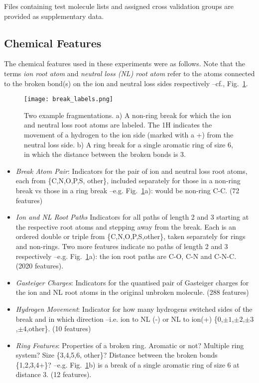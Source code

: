 Files containing test molecule lists and assigned cross validation groups are provided as supplementary data. 

\subsection{Chemical Features}
\label{sec:ChemicalFeatures}

The chemical features used in these experiments were as follows. 
Note that the terms \emph{ion root atom} and \emph{neutral loss (NL) root atom} refer to the atoms connected to the broken bond(s) on the ion and neutral loss sides respectively --cf., Fig.~\ref{fig:breakLabel}.
\begin{figure}[!tpb]
\begin{center}
\texttt{[image: break\_labels.png]}
\caption{Two example fragmentations. a) A non-ring break for which the ion and neutral loss root atoms are labeled. The 1H indicates the movement of a hydrogen to the ion side  (marked with a +) from the neutral loss side. b) A ring break for a single aromatic ring of size 6, in which the distance between the broken bonds is 3.  }
\label{fig:breakLabel}
\end{center}
\vspace{-2em}
\end{figure}
\begin{itemize}
\item \emph{Break Atom Pair}: Indicators for the pair of ion and neutral loss root atoms, each from \{C,N,O,P,S, other\}, included separately for those in a non-ring break vs those in a ring break --e.g. Fig.~\ref{fig:breakLabel}a): would be non-ring C-C. (72 features)
\item \emph{Ion and NL Root Paths} Indicators for all paths of length 2 and 3 starting at the respective root atoms and stepping away from the break. Each is an ordered double or triple from \{C,N,O,P,S,other\}, taken separately for rings and non-rings. Two more features indicate no paths of length 2 and 3 respectively --e.g. Fig.~\ref{fig:breakLabel}a): the ion root paths are C-O, C-N and C-N-C. (2020 features).
\item \emph{Gasteiger Charges}: Indicators for the quantised pair of Gasteiger charges \citep{Gasteiger1980} for the ion and NL root atoms in the original unbroken molecule. (288 features)
\item \emph{Hydrogen Movement}: Indicator for how many hydrogens switched sides of the break and in which direction --i.e. ion to NL (-) or NL to ion(+) \{0,$\pm1$,$\pm2$,$\pm3$,$\pm4$,other\}. (10 features)
\item \emph{Ring Features}: Properties of a broken ring. Aromatic or not? Multiple ring system? Size \{3,4,5,6, other\}? Distance between the broken bonds \{1,2,3,4+\}? --e.g. Fig.~\ref{fig:breakLabel}b) is a break of a single aromatic ring of size 6 at distance 3. (12 features).
\end{itemize}

